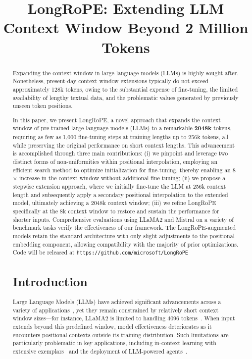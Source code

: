 \title{LongRoPE: Extending LLM Context Window Beyond 2 Million Tokens}

\begin{abstract}
Expanding the context window in large language models (LLMs) is highly sought after. Nonetheless, present-day context window extensions typically do not exceed approximately 128k tokens, owing to the substantial expense of fine-tuning, the limited availability of lengthy textual data, and the problematic values generated by previously unseen token positions.

In this paper, we present LongRoPE, a novel approach that expands the context window of pre-trained large language models (LLMs) to a remarkable \textbf{2048k} tokens, requiring as few as 1,000 fine-tuning steps at training lengths up to 256k tokens, all while preserving the original performance on short context lengths. This advancement is accomplished through three main contributions: (i) we pinpoint and leverage two distinct forms of non-uniformities within positional interpolation, employing an efficient search method to optimize initialization for fine-tuning, thereby enabling an 8$\times$ increase in the context window without additional fine-tuning; (ii) we propose a stepwise extension approach, where we initially fine-tune the LLM at 256k context length and subsequently apply a secondary positional interpolation to the extended model, ultimately achieving a 2048k context window; (iii) we refine LongRoPE specifically at the 8k context window to restore and sustain the performance for shorter inputs. Comprehensive evaluations using LLaMA2 and Mistral on a variety of benchmark tasks verify the effectiveness of our framework. The LongRoPE-augmented models retain the standard architecture with only slight adjustments to the positional embedding component, allowing compatibility with the majority of prior optimizations. Code will be released at \texttt{https://github.com/microsoft/LongRoPE}

\section{Introduction}

Large Language Models (LLMs) have achieved significant advancements across a variety of applications~\cite{gpt4,llama2}, yet they remain constrained by relatively short context window sizes—for instance, LLaMA2 is limited to handling 4096 tokens~\cite{llama2}. When input extends beyond this predefined window, model effectiveness deteriorates as it encounters positional contexts outside its training distribution. Such limitations are particularly problematic in key applications, including in-context learning with extensive exemplars~\cite{Huang2023FewerIM} and the deployment of LLM-powered agents~\cite{park2023generative,madaan2023selfrefine}.


\end{abstract}

